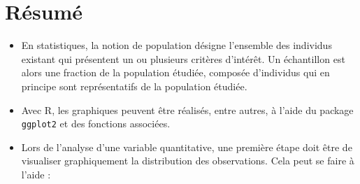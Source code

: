 \documentclass[
]{book}
\begin{document}
\hypertarget{ruxe9sumuxe9-2}{%
\section{Résumé}\label{ruxe9sumuxe9-2}}

\begin{itemize}
\item
  En statistiques, la notion de population désigne l'ensemble des individus existant qui présentent un ou plusieurs critères d'intérêt. Un échantillon est alors une fraction de la population étudiée, composée d'individus qui en principe sont représentatifs de la population étudiée.
\item
  Avec R, les graphiques peuvent être réalisés, entre autres, à l'aide du package \texttt{ggplot2} et des fonctions associées.
\item
  Lors de l'analyse d'une variable quantitative, une première étape doit être de visualiser graphiquement la distribution des observations. Cela peut se faire à l'aide :


\end{itemize}
\end{document}
